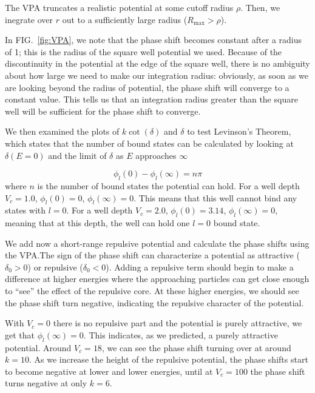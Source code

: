 \documentclass[10pt,showpacs,preprintnumbers,footinbib,amsmath,amssymb,aps,prl,twocolumn,groupedaddress,superscriptaddress,showkeys]{revtex4-1}
\begin{document}
The VPA truncates a realistic potential at some cutoff radius $\rho$.
Then, we inegrate over $r$ out to a sufficiently large radius ($R_{\mathrm{max}} > \rho$). 


In FIG.~\ref{fig:VPA}, we note that the phase shift becomes constant after a radius of 1;
this is the radius of the square well potential we used. Because of the discontinuity in the potential at the
edge of the square well, there is no ambiguity about how large we need to make our integration
radius: obviously, as soon as we are looking beyond the radius of potential, the phase shift will
converge to a constant value. This tells us that an integration radius greater than the square well 
will be sufficient for the phase shift to converge.

We then examined the plots of $k\cot(\delta)$ and $\delta$ to test Levinson's Theorem,
which states that the number of bound states can be calculated by looking at $\delta(E=0)$
and the limit of $\delta$ as $E$ approaches $\infty$

\begin{equation*}
	\phi_l(0)-\phi_l(\infty)=n\pi
\end{equation*}
where $n$ is the number of bound states the potential can hold. For a well depth $V_c=1.0$,
$\phi_l(0)=0$,  $\phi_l(\infty)=0$. This means that this well cannot bind any states
with $l=0$. For a well depth $V_c=2.0$, $\phi_l(0)=3.14$,  $\phi_l(\infty)=0$,
meaning that at this depth, the well can hold one $l=0$ bound state.

We add now a short-range repulsive potential and calculate the phase shifts using the VPA.The
sign of the phase shift can characterize a potential as attractive ($\delta_0>0$) or repulsive
($\delta_0<0$). Adding a repulsive term should begin to make a difference at higher
energies where the approaching particles can get close enough to ``see'' the effect of
the repulsive core. At these higher energies, we should see the phase shift turn negative,
indicating the repulsive character of the potential.

With $V_c=0$ there is no repulsive part and the potential is purely attractive, we get that
$\phi_l(\infty)=0$. This indicates, as we predicted, a purely attractive potential.
Around $V_c=18$, we can see the phase shift turning over at around $k=10$. As we increase
the height of the repulsive potential, the phase shifts start to become negative at lower and
lower energies, until at $V_c=100$ the phase shift turns negative at only $k=6$. 
\end{document}
